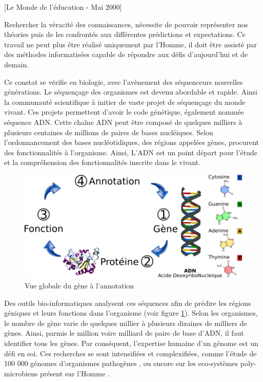 \begin{refsection}
[Le Monde de l'éducation - Mai 2000]

Rechercher la véracité des connaissances, nécessite de pouvoir représenter nos théories puis de les confrontés aux différentes prédictions et expectations. Ce travail ne peut plus être réalisé uniquement par l'Homme, il doit être assisté par des méthodes informatisées capable de répondre aux défis d'aujourd'hui et de demain.

Ce constat se vérifie en biologie, avec l'avènement des séquenceurs nouvelles générations. Le séquençage des organismes est devenu abordable et rapide. Ainsi la communauté scientifique à initier de vaste projet de séquençage du monde vivant. Ces projets permettent d'avoir le code génétique, également nommée séquence \gls{ADN}. Cette chaîne \gls{ADN} peut être composé de quelques milliers à plusieurs centaines de millions de paires de bases nucléiques. Selon l'ordonnancement des bases nucléotidiques, des régions appelées gènes, procurent des fonctionnalités à l'organisme. Ainsi, L'\gls{ADN} est un point départ pour l'étude et la compréhension des fonctionnalités inscrite dans le vivant.

\begin{figure}[!h]
    \centering
    \includegraphics{img/simple_annotation_process_numéroté.png}
    \caption{Vue globale du gène à l'annotation }
    \label{fig:glob_annotation}
\end{figure}

Des outils bio-informatiques analysent ces séquences afin de prédire les régions géniques et leurs fonctions dans l'organisme (voir figure \ref{fig:glob_annotation}). Selon les organismes, le nombre de gène varie de quelques millier à plusieurs dizaines de milliers de gènes. Ainsi, parmis le million voire milliard de paire de base d'\gls{ADN}, il faut identifier tous les gènes. Par conséquent, l'expertise humaine d'un génome est un défi en soi. Ces recherches se sont intensifiées et complexifiées, comme l'étude de 100 000 génomes d'organismes pathogènes \cite{100kfoodborne}, ou encore sur les eco-systèmes poly-microbiens présent sur l'Homme \cite{hmp}.


\end{refsection}
